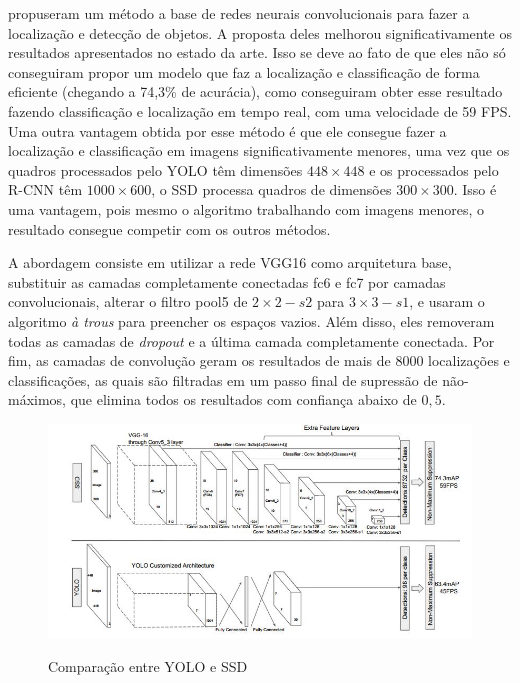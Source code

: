  propuseram um método a base de redes neurais convolucionais para fazer a localização e detecção de objetos. A proposta deles melhorou significativamente os resultados apresentados no estado da arte. Isso se deve ao fato de que eles não só conseguiram propor um modelo que faz a localização e classificação de forma eficiente (chegando a 74,3\% de acurácia), como conseguiram obter esse resultado fazendo classificação e localização em tempo real, com uma velocidade de 59 \ac{FPS}. Uma outra vantagem obtida por esse método é que ele consegue fazer a localização e classificação em imagens significativamente menores, uma vez que os quadros processados pelo \ac{YOLO} têm dimensões $448 \times 448$ e os processados pelo \ac{R-CNN} têm $1000\times 600$, o \ac{SSD} processa quadros de dimensões $300 \times 300$. Isso é uma vantagem, pois mesmo o algoritmo trabalhando com imagens menores, o resultado consegue competir com os outros métodos.

A abordagem consiste em utilizar a rede VGG16 \cite{simonyan-2014} como arquitetura base, substituir as camadas completamente conectadas fc6 e fc7 por camadas convolucionais, alterar o filtro pool5 de $2 \times 2 - s2$ para $3 \times 3 - s1$, e usaram o algoritmo \textit{à trous}\cite{holschneider-1990} para preencher os espaços vazios. Além disso, eles removeram todas as camadas de \textit{dropout} e a última camada completamente conectada. Por fim, as camadas de convolução geram os resultados de mais de 8000 localizações e classificações, as quais são filtradas em um passo final de supressão de não-máximos, que elimina todos os resultados com confiança abaixo de $0,5$.

  \begin{figure}[H]
	\setlength{\abovecaptionskip}{0pt}
	\setlength{\belowcaptionskip}{0pt}
	\caption[YOLO e SSD]{Comparação entre \ac{YOLO} e \ac{SSD}}
	\centering
	\includegraphics[width=.6\textwidth]{imagem/0x_yoloxssd.JPG}
	\captionsetup{justification=centering}
	\label{fig:yoloxssd}
\end{figure}

